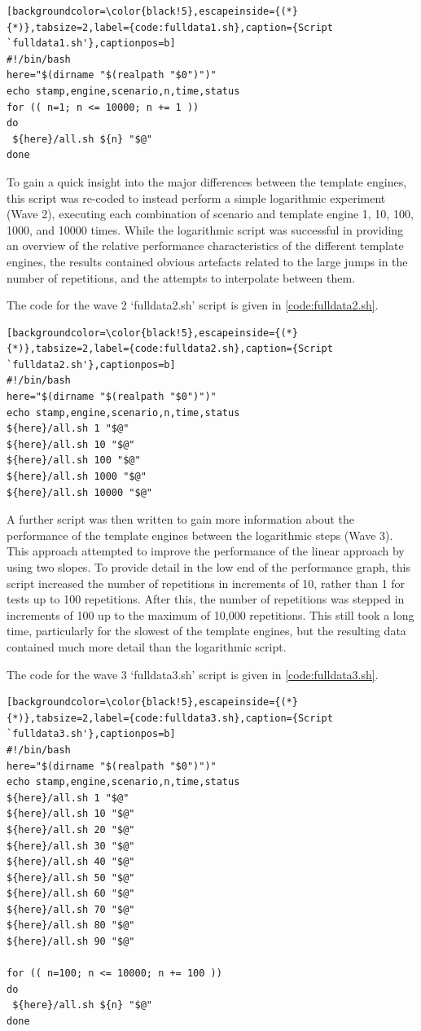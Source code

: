 \begin{lstlisting}[backgroundcolor=\color{black!5},escapeinside={(*}{*)},tabsize=2,label={code:fulldata1.sh},caption={Script `fulldata1.sh'},captionpos=b]
#!/bin/bash
here="$(dirname "$(realpath "$0")")"
echo stamp,engine,scenario,n,time,status
for (( n=1; n <= 10000; n += 1 ))
do
 ${here}/all.sh ${n} "$@"
done
\end{lstlisting}

To gain a quick insight into the major differences between the template engines, this script was re-coded to instead perform a simple logarithmic experiment (Wave 2), executing each combination of scenario and template engine 1, 10, 100, 1000, and 10000 times. While the logarithmic script was successful in providing an overview of the relative performance characteristics of the different template engines, the results contained obvious artefacts related to the large jumps in the number of repetitions, and the attempts to interpolate between them.

The code for the wave 2 `fulldata2.sh' script is given in \autoref{code:fulldata2.sh}.

\begin{lstlisting}[backgroundcolor=\color{black!5},escapeinside={(*}{*)},tabsize=2,label={code:fulldata2.sh},caption={Script `fulldata2.sh'},captionpos=b]
#!/bin/bash
here="$(dirname "$(realpath "$0")")"
echo stamp,engine,scenario,n,time,status
${here}/all.sh 1 "$@"
${here}/all.sh 10 "$@"
${here}/all.sh 100 "$@"
${here}/all.sh 1000 "$@"
${here}/all.sh 10000 "$@"
\end{lstlisting}

A further script was then written to gain more information about the performance of the template engines between the logarithmic steps (Wave 3). This approach attempted to improve the performance of the linear approach by using two slopes. To provide detail in the low end of the performance graph, this script increased the number of repetitions in increments of 10, rather than 1 for tests up to 100 repetitions. After this, the number of repetitions was stepped in increments of 100 up to the maximum of 10,000 repetitions. This still took a long time, particularly for the slowest of the template engines, but the resulting data contained much more detail than the logarithmic script.

The code for the wave 3 `fulldata3.sh' script is given in \autoref{code:fulldata3.sh}.

\begin{lstlisting}[backgroundcolor=\color{black!5},escapeinside={(*}{*)},tabsize=2,label={code:fulldata3.sh},caption={Script `fulldata3.sh'},captionpos=b]
#!/bin/bash
here="$(dirname "$(realpath "$0")")"
echo stamp,engine,scenario,n,time,status
${here}/all.sh 1 "$@"
${here}/all.sh 10 "$@"
${here}/all.sh 20 "$@"
${here}/all.sh 30 "$@"
${here}/all.sh 40 "$@"
${here}/all.sh 50 "$@"
${here}/all.sh 60 "$@"
${here}/all.sh 70 "$@"
${here}/all.sh 80 "$@"
${here}/all.sh 90 "$@"

for (( n=100; n <= 10000; n += 100 ))
do
 ${here}/all.sh ${n} "$@"
done
\end{lstlisting}

